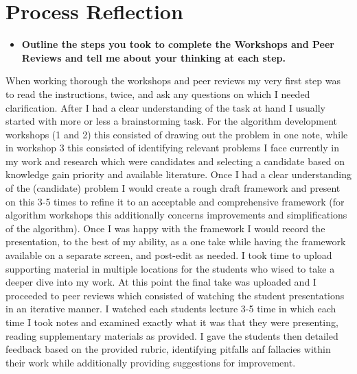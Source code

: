 \documentclass[12pt]{article}
\begin{document}
\section{Process Reflection}
\begin{itemize}
    \item \textbf{Outline the steps you took to complete the Workshops and Peer Reviews and tell me about your thinking at each step.}
\end{itemize}

When working thorough the workshops and peer reviews my very first step was to read the instructions, twice, and ask any questions on which I needed clarification. After I had a clear understanding of the task at hand I usually started with more or less a brainstorming task. For the algorithm development workshops (1 and 2) this consisted of drawing out the problem in one note, while in workshop 3 this consisted of identifying relevant problems I face currently in my work and research which were candidates and selecting a candidate based on knowledge gain priority and available literature. Once I had a clear understanding of the (candidate) problem I would create a rough draft framework and present on this 3-5 times to refine it to an acceptable and comprehensive framework (for algorithm workshops this additionally concerns improvements and simplifications of the algorithm). Once I was happy with the framework I would record the presentation, to the best of my ability, as a one take while having the framework available on a separate screen, and post-edit as needed. I took time to upload supporting material in multiple locations for the students who wised to take a deeper dive into my work. At this point the final take was uploaded and I proceeded to peer reviews which consisted of watching the student presentations in an iterative manner. I watched each students lecture 3-5 time in which each time I took notes and examined exactly what it was that they were presenting, reading supplementary materials as provided. I gave the students then detailed feedback based on the provided rubric, identifying pitfalls anf fallacies within their work while additionally providing suggestions for improvement. 
\end{document}
